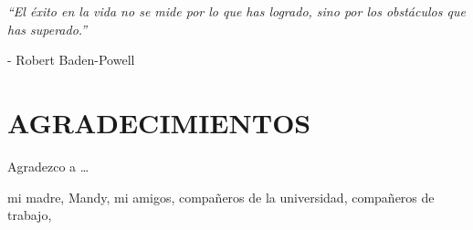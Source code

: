 \documentclass[a4paper, 12pt, spanish, twoside]{article}
\newcommand\blankpage{%
    \null
    \thispagestyle{empty}%
    \newpage}
\begin{document}




\newpage
\thispagestyle{empty}

\begin{flushright} %
\vspace*{5cm} %

\textit{“El éxito en la vida no se mide por lo que has logrado, sino por los obstáculos que has superado.”} 

\medskip %
- Robert Baden-Powell 

\end{flushright}

\clearpage
\afterpage{\blankpage} %





\newpage
\thispagestyle{plain}

\section*{AGRADECIMIENTOS} %

Agradezco a \dots

mi madre,
Mandy,
mi amigos,
compañeros de la universidad,
compañeros de trabajo,
\end{document}
